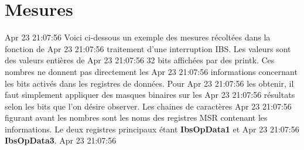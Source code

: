   \section{Mesures}
    
 Apr 23 21:07:56    Voici ci-dessous un exemple des mesures récoltées dans la fonction de
 Apr 23 21:07:56    traitement d'une interruption IBS. Les valeurs sont des valeurs entières de
 Apr 23 21:07:56    32 bits affichées par des printk. Ces nombres ne donnent pas directement les
 Apr 23 21:07:56    informations concernant les bits activés dans les registres de données. Pour
 Apr 23 21:07:56    les obtenir, il faut simplement appliquer des masques binaires sur les
 Apr 23 21:07:56    résultats selon les bits que l'on désire observer. Les chaines de caractères
 Apr 23 21:07:56    figurant avant les nombres sont les noms des registres MSR contenant les
                    informations. Le deux registres principaux étant \textbf{IbsOpData1} et
 Apr 23 21:07:56    \textbf{IbsOpData3}.
 Apr 23 21:07:56 
